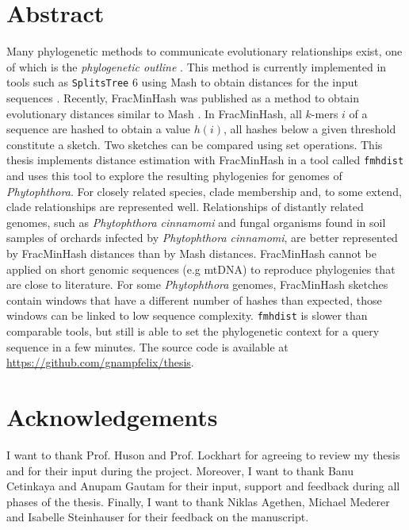 
\section*{Abstract}
Many phylogenetic methods to communicate evolutionary relationships exist, one
of which is the \textit{phylogenetic outline}
\cite{bagciMicrobialPhylogeneticContext2021}. This method is currently
implemented in tools such as \texttt{SplitsTree} 6
\cite{husonApplicationPhylogeneticNetworks2006} using Mash to obtain distances
for the input sequences \cite{ondovMashFastGenome2016}. Recently, FracMinHash
was published as a method to obtain evolutionary distances similar to Mash
\cite{irberLightweightCompositionalAnalysis2022}. In FracMinHash, all $k$-mers
$i$ of a sequence are hashed to obtain a value $h(i)$, all hashes below a given
threshold constitute a sketch. Two sketches can be compared using set
operations. This thesis implements distance estimation with FracMinHash in a
tool called \texttt{fmhdist} and uses this tool to explore the resulting
phylogenies for genomes of \textit{Phytophthora}. For closely related species,
clade membership and, to some extend, clade relationships are represented well.
Relationships of distantly related genomes, such as \textit{Phytophthora
cinnamomi} and fungal organisms found in soil samples of orchards infected by
\textit{Phytophthora cinnamomi}, are better represented by FracMinHash distances
than by Mash distances. FracMinHash cannot be applied on short genomic sequences
(e.g mtDNA) to reproduce phylogenies that are close to literature. For some
\textit{Phytophthora} genomes, FracMinHash sketches contain windows that have a
different number of hashes than expected, those windows can be linked to low
sequence complexity. \texttt{fmhdist} is slower than comparable tools, but still
is able to set the phylogenetic context
\cite{bagciMicrobialPhylogeneticContext2021} for a query sequence in a few
minutes. The source code is available at
\url{https://github.com/gnampfelix/thesis}.
\newpage


\section*{Acknowledgements}
I want to thank Prof. Huson and Prof. Lockhart for agreeing to review my thesis
and for their input during the project. Moreover, I want to thank Banu Cetinkaya
and Anupam Gautam for their input, support and feedback during all phases of the
thesis. Finally, I want to thank Niklas Agethen, Michael Mederer and Isabelle
Steinhauser for their feedback on the manuscript.